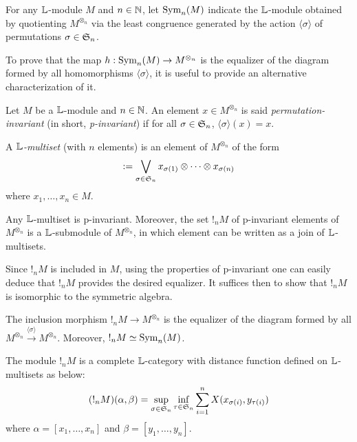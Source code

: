 \begin{definition}

For any $\mathbb{L}$-module $M$ and $n\in \mathbb{N}$, let $\mathrm{Sym}_{n}(M)$ indicate the $\mathbb{L}$-module obtained by quotienting 
$M^{\otimes_{n}}$ via the least congruence generated by the action $\langle \sigma \rangle$ of permutations $\sigma\in \mathfrak{S}_{n}$.
\end{definition}


To prove that the map $h:\mathrm{Sym}_{n}(M)\to M^{\otimes_{n}} $ is the equalizer of the diagram formed by all homomorphisms $\langle \sigma\rangle$, it is useful to provide an alternative characterization of it. 

\begin{definition}
Let $M$ be a $\mathbb{L}$-module and $n\in \mathbb{N}$. An element $x\in M^{\otimes_{n}}$ is said \emph{permutation-invariant} (in short, \emph{p-invariant}) if for all $\sigma\in \mathfrak{S}_{n}$, 
$\langle \sigma \rangle (x)=x$. 


 A \emph{$\mathbb{L}$-multiset} (with $n$ elements) is an element of $M^{\otimes_{n}}$ of the form 
 \begin{align}
 [x_{1},\dots, x_{n}]:= \bigvee_{\sigma\in \F S_{n}}
 x_{\sigma(1)}\otimes \dots \otimes x_{\sigma(n)}
 \end{align}
where $x_{1},\dots, x_{n}\in M$.
\end{definition} 

\begin{proposition}
Any $\mathbb{L}$-multiset is p-invariant. Moreover, the set $!_{n}M$ of p-invariant elements of $M^{\otimes_{n}}$ is a $\mathbb{L}$-submodule of $M^{\otimes_{n}}$, in which element can be written as a join of $\mathbb{L}$-multisets.
\end{proposition}

Since $!_{n}M$ is included in $M$, using the properties of p-invariant one can easily deduce that $!_{n}M$ provides the desired equalizer. It suffices then to show that $!_{n}M$ is isomorphic to the symmetric algebra.


\begin{proposition}
The inclusion morphism $!_{n}M \to M^{\otimes_{n}}$ is the equalizer of the diagram formed by all $M^{\otimes_{n}}\stackrel{\langle \sigma\rangle}{\to} M^{\otimes_{n}}$. Moreover, 
$!_{n}M \simeq \mathrm{Sym}_{n}(M)$.
\end{proposition}


The module $!_{n}M$ is a complete $\mathbb{L}$-category with distance function defined on $\mathbb{L}$-multisets as below:
\begin{align}
(!_{n}M)(\alpha,\beta)=
\sup_{\sigma\in \mathfrak{S}_{n}}\inf_{\tau\in \mathfrak{S}_{n}}\sum_{i=1}^{n}
X(x_{\sigma(i)},y_{\tau(i)})
\end{align}
where $\alpha=[x_{1},\dots, x_{n}]$ and $\beta= [y_{1},\dots, y_{n}]$.




